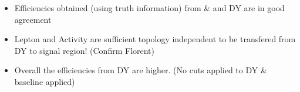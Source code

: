 \documentclass{beamer}
\begin{document}
\begin{frame}
\begin{columns}
\begin{column}{0.33\textwidth}
   \end{column}
  \end{columns}
\begin{itemize}
 \item Efficiencies obtained (using truth information) from \ttbar \& \wpj and DY are in good agreement
 \item Lepton \pt and Activity are sufficient topology independent to be transfered from DY to signal region! (Confirm Florent)
 \item Overall the efficiencies from DY are higher. (No cuts applied to DY \ttbar \& \wpj baseline applied)
\end{itemize}
\end{frame}
\end{document}
